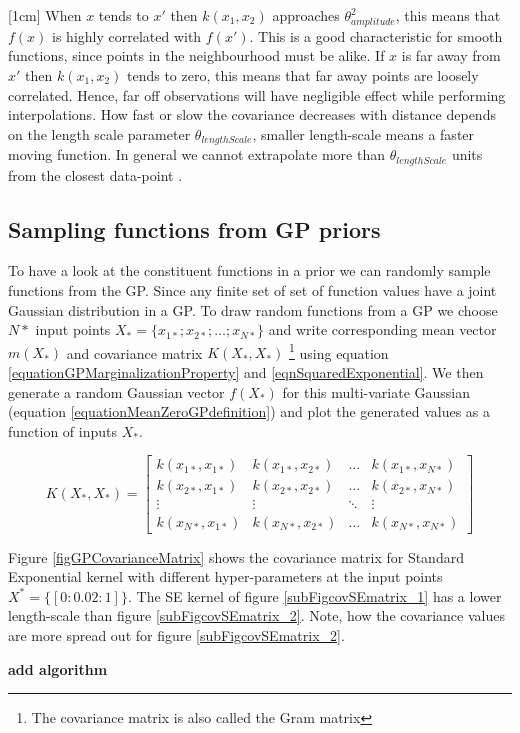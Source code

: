 [1cm]
When $x$ tends to $x'$ then $k(x_{1}, x_{2})$ approaches $\theta_{amplitude}^{2}$, this means that $f(x)$ is highly correlated with $f(x')$. This is a good characteristic for smooth functions, since points in the neighbourhood must be alike. If $x$ is far away from  $x'$ then $k(x_{1}, x_{2})$ tends to zero, this means that far away points are loosely correlated. Hence, far off observations will have negligible effect while performing interpolations. How fast or slow the covariance decreases with distance depends on the length scale parameter $\theta_{lengthScale}$, smaller length-scale means a faster moving function. In general we cannot extrapolate more than $\theta_{lengthScale}$ units from the closest data-point \cite{duvenaud-thesis-2014}. 

\subsection{Sampling functions from GP priors}\label{subSecSamplingFunctionsGPPrior}
\begin{mdframed}[hidealllines=true,backgroundcolor=lightgray!20]
To have a look at the constituent functions in a prior we can randomly sample functions from the GP. Since any finite set of set of function values have a joint Gaussian distribution in a GP. To draw random functions from a GP we choose $N*$ input points $X_{*} = \{x_{1*}; x_{2*}; \ldots ; x_{N*}\}$ and write corresponding mean vector $m(X_{*})$ and covariance matrix $K(X_{*}, X_{*} )$ \footnote{The covariance matrix is also called the Gram matrix} using equation \ref{equationGPMarginalizationProperty} and \ref{eqnSquaredExponential}. We then generate a random Gaussian vector $f(X_{*})$ for this multi-variate Gaussian (equation \ref{equationMeanZeroGPdefinition}) and plot the generated values as a function of inputs $X_{*}$. 

\begin{equation}\label{eqnCovMatrixSquaredExponential}
K(X_{*}, X_{*} ) = \left [ \begin{matrix}
k(x_{1*}, x_{1*}) & k(x_{1*}, x_{2*}) & \ldots & k(x_{1*}, x_{N*})
\\ k(x_{2*}, x_{1*}) & k(x_{2*}, x_{2*}) & \ldots & k(x_{2*}, x_{N*})
\\ \vdots & \vdots & \ddots & \vdots
\\ k(x_{N*}, x_{1*}) & k(x_{N*}, x_{2*}) & \ldots & k(x_{N*}, x_{N*})
\end{matrix} \right ] 
\end{equation}

Figure \ref{figGPCovarianceMatrix} shows the covariance matrix for Standard Exponential kernel with different hyper-parameters at the input points $X^{*} = \{[0:0.02:1]\}$. The SE kernel of figure \ref{subFigcovSEmatrix_1} has a lower length-scale than figure \ref{subFigcovSEmatrix_2}. Note, how the covariance values are more spread out for figure \ref{subFigcovSEmatrix_2}.

\textbf{add algorithm}

\end{mdframed}

